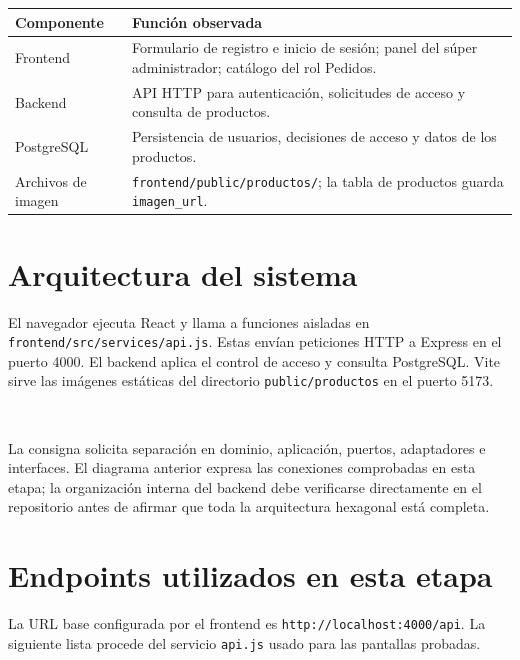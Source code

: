 \documentclass[11pt,letterpaper]{article}
\begin{document}
\begin{tabularx}{\textwidth}{>{\raggedright\arraybackslash}p{4.0cm}X}
\toprule
\textbf{Componente} & \textbf{Función observada}\\ \midrule
Frontend & Formulario de registro e inicio de sesión; panel del súper administrador; catálogo del rol Pedidos.\\
Backend & API HTTP para autenticación, solicitudes de acceso y consulta de productos.\\
PostgreSQL & Persistencia de usuarios, decisiones de acceso y datos de los productos.\\
Archivos de imagen & \texttt{frontend/public/productos/}; la tabla de productos guarda \texttt{imagen\_url}.\\
\bottomrule
\end{tabularx}

\section{Arquitectura del sistema}
El navegador ejecuta React y llama a funciones aisladas en \texttt{frontend/src/services/api.js}. Estas envían peticiones HTTP a Express en el puerto 4000. El backend aplica el control de acceso y consulta PostgreSQL. Vite sirve las imágenes estáticas del directorio \texttt{public/productos} en el puerto 5173.

\begin{center}
\\[5pt]
\end{center}

La consigna solicita separación en dominio, aplicación, puertos, adaptadores e interfaces. El diagrama anterior expresa las conexiones comprobadas en esta etapa; la organización interna del backend debe verificarse directamente en el repositorio antes de afirmar que toda la arquitectura hexagonal está completa.

\section{Endpoints utilizados en esta etapa}
La URL base configurada por el frontend es \texttt{http://localhost:4000/api}. La siguiente lista procede del servicio \texttt{api.js} usado para las pantallas probadas.
\end{document}
